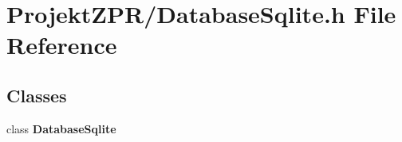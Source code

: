 \section{Projekt\-Z\-P\-R/\-Database\-Sqlite.h File Reference}
\label{_database_sqlite_8h}
\subsection*{Classes}
\begin{DoxyCompactItemize}
\item 
class {\bf Database\-Sqlite}
\end{DoxyCompactItemize}

